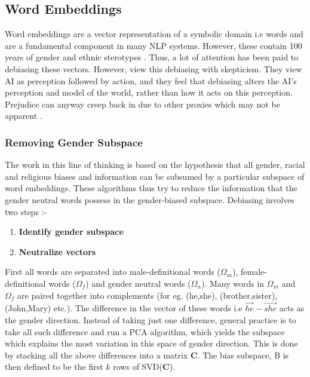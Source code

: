 \documentclass[11pt,a4paper]{article}
\begin{document}
\begin{enumerate}
    \subsection{Word Embeddings}
    Word embeddings are a vector representation of a symbolic domain i.e words and are a fundamental component in many NLP systems. However, these contain 100 years of gender and ethnic sterotypes \cite{GargE3635}. Thus, a lot of attention has been paid to debiasing these vectors. However, \citet{Caliskan183} view this debiasing with skepticism. They view AI as perception followed by action, and they feel that debiasing alters the AI's perception and model of the world, rather than how it acts on this perception. Prejudice can anyway creep back in due to other proxies which may not be apparent \cite{gonen-goldberg-2019-lipstick}. 
    
    \subsubsection{Removing Gender Subspace}
    
    The work in this line of thinking is based on the hypothesis that all gender, racial and religious biases and information can be subsumed by a particular subspace of word embeddings. These algorithms thus try to reduce the information that the gender neutral words possess in the gender-biased subspace. Debiasing involves two steps :-
    
    \begin{enumerate}
        \item \textbf{Identify gender subspace}
        \item \textbf{Neutralize vectors}
    \end{enumerate}
    
    First all words are separated into male-definitional words ($\Omega_m$), female-definitional words ($\Omega_f$) and gender neutral words ($\Omega_n$). Many words in $\Omega_m$ and $\Omega_f$ are paired together into complements (for eg. (he,she), (brother,sister), (John,Mary) etc.). The difference in the vector of these words i.e $\vec{he} - \vec{she}$ acts as the gender direction. Instead of taking just one difference, general practice is to take all such difference and run a PCA algorithm, which yields the subspace which explains the most variation in this space of gender direction. This is done by stacking all the above differences into a matrix \textbf{C}. The bias subspace, B is then defined to be the first $k$ rows of SVD(\textbf{C}).
    

\end{enumerate}
\end{document}
